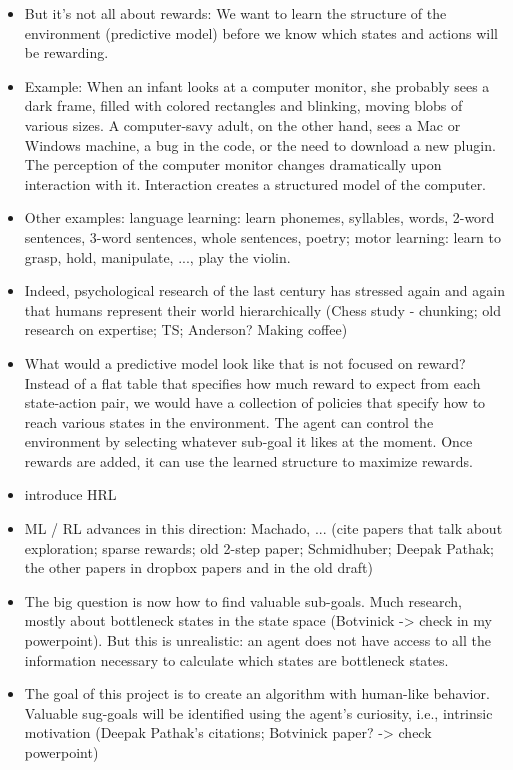 \documentclass{article}
\begin{document}
\begin{itemize}
	\item But it's not all about rewards: We want to learn the structure of the environment (predictive model) before we know which states and actions will be rewarding.
	\item Example: When an infant looks at a computer monitor, she probably sees a dark frame, filled with colored rectangles and blinking, moving blobs of various sizes. A computer-savy adult, on the other hand, sees a Mac or Windows machine, a bug in the code, or the need to download a new plugin. The perception of the computer monitor changes dramatically upon interaction with it. Interaction creates a structured model of the computer.
	\item Other examples: language learning: learn phonemes, syllables, words, 2-word sentences, 3-word sentences, whole sentences, poetry; motor learning: learn to grasp, hold, manipulate, ..., play the violin.
	\item Indeed, psychological research of the last century has stressed again and again that humans represent their world hierarchically (Chess study - chunking; old research on expertise; TS; Anderson? Making coffee)
	\item What would a predictive model look like that is not focused on reward? Instead of a flat table that specifies how much reward to expect from each state-action pair, we would have a collection of policies that specify how to reach various states in the environment. The agent can control the environment by selecting whatever sub-goal it likes at the moment. Once rewards are added, it can use the learned structure to maximize rewards. 
	\item introduce HRL
	\item ML / RL advances in this direction: Machado, ... (cite papers that talk about exploration; sparse rewards; old 2-step paper; Schmidhuber; Deepak Pathak; the other papers in dropbox papers and in the old draft)
	\item The big question is now how to find valuable sub-goals. Much research, mostly about bottleneck states in the state space (Botvinick -> check in my powerpoint). But this is unrealistic: an agent does not have access to all the information necessary to calculate which states are bottleneck states. 
	\item The goal of this project is to create an algorithm with human-like behavior. Valuable sug-goals will be identified using the agent's curiosity, i.e., intrinsic motivation (Deepak Pathak's citations; Botvinick paper? -> check powerpoint)
\end{itemize}
\fi 

\printbibliography
\end{document}
